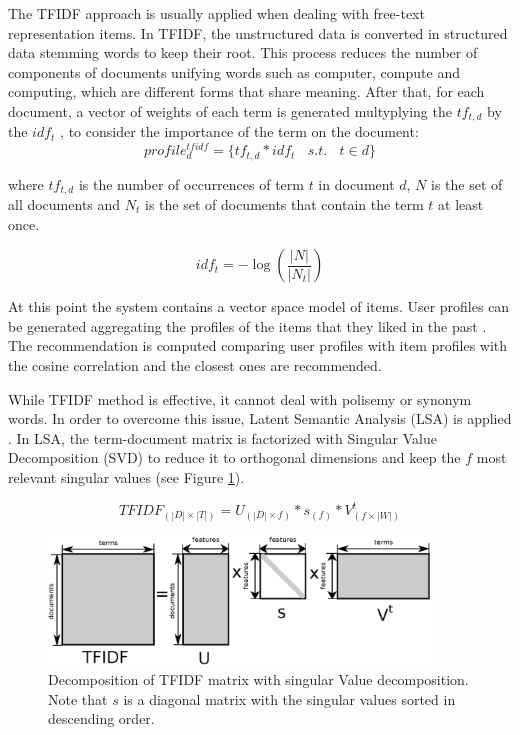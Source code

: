 \documentclass[preprint]{elsarticle}
\begin{document}
\begin{spacing}{1.5}
The TFIDF approach \cite{Erra2015} is usually applied when dealing with free-text representation items. In TFIDF, the unstructured data is converted in structured data stemming words \cite{Porter1980} to keep their root. This process reduces the number of components of documents unifying words such as computer, compute and computing, which are different forms that share meaning. After that, for each document, a vector of weights of each term is generated multyplying the $tf_{t,d}$ by the $idf_{t}$ \cite{Lops2011}, to consider the importance of the term on the document:
\begin{equation}
	profile^{tfidf}_{d} = \{tf_{t,d}*idf_{t}~~~~s.t.~~~~ t \in d \}
	\label{eq:document-profile-tfidf}
\end{equation}

\noindent where $tf_{t,d}$ is the number of occurrences of term $t$ in document $d$, $N$ is the set of all documents and $N_t$ is the set of documents that contain the term $t$ at least once.

\begin{equation}
	idf_t = -\log \left( \frac{|N|}{|N_t|}\right)
	\label{eq:document-profile-tfidf-idf}
\end{equation}

At this point the system contains a vector space model of items. User profiles can be generated aggregating the profiles of the items that they liked in the past \cite{Symeonidis2007}. The recommendation is computed comparing user profiles with item profiles with the cosine correlation and the closest ones are recommended. 

While TFIDF method is effective, it cannot deal with polisemy or synonym words. In order to overcome this issue, Latent Semantic Analysis (LSA) is applied \cite{deGemmis2015}. In LSA, the term-document matrix is factorized with Singular Value Decomposition (SVD) to reduce it to orthogonal dimensions and keep the $f$ most relevant singular values (see Figure \ref{fig:svd-scheme}).

\begin{equation}
	TFIDF_{(|D|\times|T|)} = U_{(|D|\times f)} * s_{(f)} * V^t_{(f \times |W|)}
	\label{eq:svd}
\end{equation}

\begin{figure}[h]
	\centering
	\includegraphics[width=0.9\textwidth]{figures/svd-scheme.eps}
	\caption{Decomposition of TFIDF matrix with singular Value decomposition. Note that $s$ is a diagonal matrix with the singular values sorted in descending order.}
	\label{fig:svd-scheme}
\end{figure}


\end{spacing}
\end{document}
